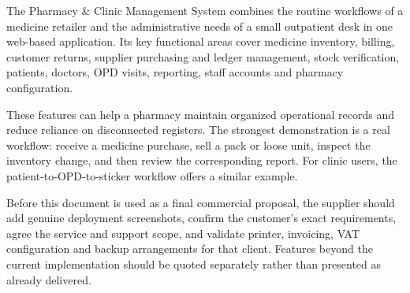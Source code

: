 \documentclass[11pt,a4paper]{article}
\begin{document}
The Pharmacy \& Clinic Management System combines the routine workflows of a medicine retailer and the administrative needs of a small outpatient desk in one web-based application. Its key functional areas cover medicine inventory, billing, customer returns, supplier purchasing and ledger management, stock verification, patients, doctors, OPD visits, reporting, staff accounts and pharmacy configuration.

These features can help a pharmacy maintain organized operational records and reduce reliance on disconnected registers. The strongest demonstration is a real workflow: receive a medicine purchase, sell a pack or loose unit, inspect the inventory change, and then review the corresponding report. For clinic users, the patient-to-OPD-to-sticker workflow offers a similar example.

Before this document is used as a final commercial proposal, the supplier should add genuine deployment screenshots, confirm the customer's exact requirements, agree the service and support scope, and validate printer, invoicing, VAT configuration and backup arrangements for that client. Features beyond the current implementation should be quoted separately rather than presented as already delivered.
\end{document}
